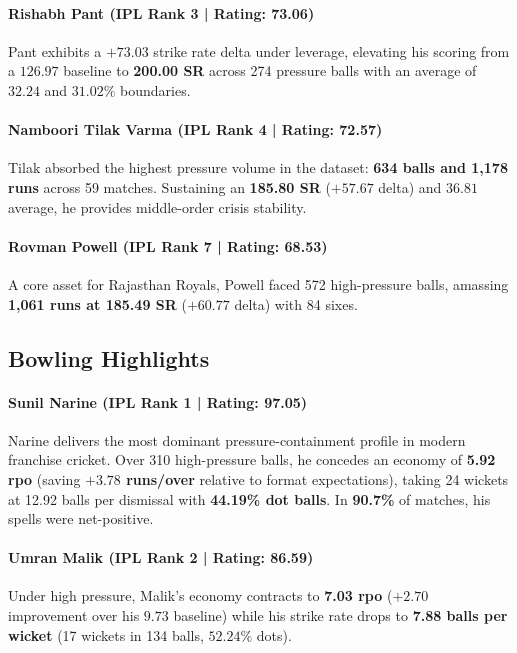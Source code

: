 \documentclass[11pt,a4paper]{article}
\begin{document}
\paragraph{Rishabh Pant (IPL Rank 3 | Rating: 73.06)}
Pant exhibits a $+73.03$ strike rate delta under leverage, elevating his scoring from a $126.97$ baseline to \textbf{200.00 SR} across 274 pressure balls with an average of $32.24$ and $31.02\%$ boundaries.

\paragraph{Namboori Tilak Varma (IPL Rank 4 | Rating: 72.57)}
Tilak absorbed the highest pressure volume in the dataset: \textbf{634 balls and 1,178 runs} across 59 matches. Sustaining an \textbf{185.80 SR} ($+57.67$ delta) and $36.81$ average, he provides middle-order crisis stability.

\paragraph{Rovman Powell (IPL Rank 7 | Rating: 68.53)}
A core asset for Rajasthan Royals, Powell faced 572 high-pressure balls, amassing \textbf{1,061 runs at 185.49 SR} ($+60.77$ delta) with 84 sixes.

\subsection{Bowling Highlights}
\paragraph{Sunil Narine (IPL Rank 1 | Rating: 97.05)}
Narine delivers the most dominant pressure-containment profile in modern franchise cricket. Over 310 high-pressure balls, he concedes an economy of \textbf{5.92 rpo} (saving \textbf{$+3.78$ runs/over} relative to format expectations), taking 24 wickets at 12.92 balls per dismissal with \textbf{44.19\% dot balls}. In \textbf{90.7\%} of matches, his spells were net-positive.

\paragraph{Umran Malik (IPL Rank 2 | Rating: 86.59)}
Under high pressure, Malik's economy contracts to \textbf{7.03 rpo} ($+2.70$ improvement over his $9.73$ baseline) while his strike rate drops to \textbf{7.88 balls per wicket} (17 wickets in 134 balls, $52.24\%$ dots).
\end{document}
